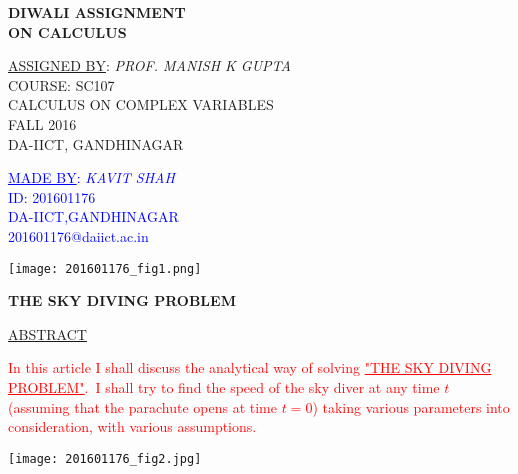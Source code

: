 \documentclass[14pt]{article}
\begin{document}
\pagecolor{blue!10!white}
\vspace{1cm}
\begin{center}
\Huge{\bf \textcolor{blue!80!white}{ DIWALI ASSIGNMENT \\ ON CALCULUS}
     }
\end{center}
\begin{center}
\vspace{1.5cm}
\huge{\underline{ASSIGNED BY}:\textsl{ PROF. MANISH K GUPTA}\\COURSE: SC107\\CALCULUS ON COMPLEX VARIABLES\\
FALL 2016\\DA-IICT, GANDHINAGAR\\
	 }
\end{center}
\vspace{1cm}
\begin{center}\huge
{\textcolor{blue}
{\underline{MADE BY}: \textsl{KAVIT SHAH}\\
 ID: 201601176\\
 DA-IICT,GANDHINAGAR\\
 201601176@daiict.ac.in\\
}
} 
\end{center}
\vspace{0.5cm}
\begin{center}
\texttt{[image: 201601176\_fig1.png]}
\end{center}
\newpage
\vspace{1cm}
\begin{center}
\Huge{\bf \textcolor{blue!80!white}{ THE SKY DIVING PROBLEM}
     }
\end{center}
\vspace{1.5cm}
\begin{center}
\huge{\underline{\textcolor{blue!60!green}{ABSTRACT}}
     }
\end{center}
\vspace{0.5cm}
\huge{\textcolor{red}{In this article I shall discuss the analytical way of solving \underline{"THE SKY DIVING PROBLEM"}.\ I shall try to find the speed of the sky diver at any time $t$ (assuming that the parachute opens at time $t=0$) taking various parameters into \\ consideration, with various assumptions.
                     }
     }   
\vspace{3cm}
\begin{center}
\texttt{[image: 201601176\_fig2.jpg]}
\end{center}
\cite{imagea}
\end{document}
